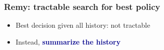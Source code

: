 \documentclass[svgnames]{beamer}
\newcommand{\ssline}{\vspace{8 pt}}
\begin{document}
%
%
%
%
%
%
%
%

\begin{frame}
\frametitle{Remy: tractable search for best policy}

\Large

\begin{centering}

\end{centering}

\ssline
\ssline
\ssline

\begin{itemize}

\item Best decision given all history: not tractable

\item Instead, \textbf{\textcolor{DarkBlue}{summarize the history}}

\end{itemize}

\end{frame}
\end{document}
